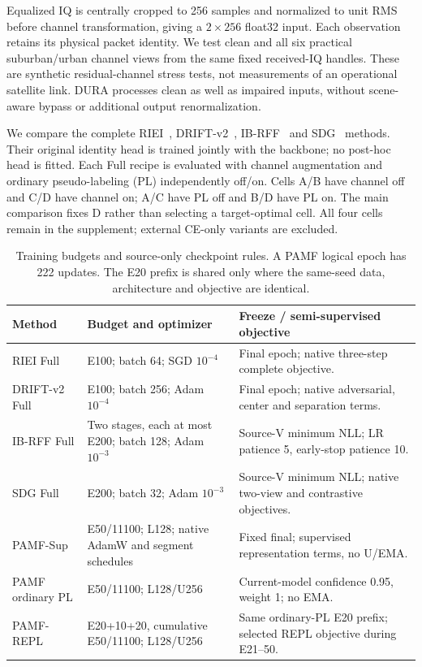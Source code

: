Equalized IQ is centrally cropped to 256 samples and normalized to unit RMS before channel transformation, giving a $2\times256$ float32 input. Each observation retains its physical packet identity. We test clean and all six practical suburban/urban channel views from the same fixed received-IQ handles. These are synthetic residual-channel stress tests, not measurements of an operational satellite link. DURA processes clean as well as impaired inputs, without scene-aware bypass or additional output renormalization.

We compare the complete RIEI~\cite{riei}, DRIFT-v2~\cite{drift}, IB-RFF~\cite{ibrff} and SDG~\cite{sdg} methods. Their original identity head is trained jointly with the backbone; no post-hoc head is fitted. Each Full recipe is evaluated with channel augmentation and ordinary pseudo-labeling (PL) independently off/on. Cells A/B have channel off and C/D have channel on; A/C have PL off and B/D have PL on. The main comparison fixes D rather than selecting a target-optimal cell. All four cells remain in the supplement; external CE-only variants are excluded.

\begin{table}[!t]\centering\footnotesize
\caption{Training budgets and source-only checkpoint rules. A PAMF logical epoch has 222 updates. The E20 prefix is shared only where the same-seed data, architecture and objective are identical.}
\label{tab:repl-budget}
\begin{tabular*}{\textwidth}{@{\extracolsep{\fill}}lp{}p{}@{}}\toprule
Method & Budget and optimizer & Freeze / semi-supervised objective\\\midrule
RIEI Full & E100; batch 64; SGD $10^{-4}$ & Final epoch; native three-step complete objective.\\
DRIFT-v2 Full & E100; batch 256; Adam $10^{-4}$ & Final epoch; native adversarial, center and separation terms.\\
IB-RFF Full & Two stages, each at most E200; batch 128; Adam $10^{-3}$ & Source-V minimum NLL; LR patience 5, early-stop patience 10.\\
SDG Full & E200; batch 32; Adam $10^{-3}$ & Source-V minimum NLL; native two-view and contrastive objectives.\\
PAMF-Sup & E50/11100; L128; native AdamW and segment schedules & Fixed final; supervised representation terms, no U/EMA.\\
PAMF ordinary PL & E50/11100; L128/U256 & Current-model confidence 0.95, weight 1; no EMA.\\
PAMF-REPL & E20+10+20, cumulative E50/11100; L128/U256 & Same ordinary-PL E20 prefix; selected REPL objective during E21--50.\\\bottomrule
\end{tabular*}\end{table}

